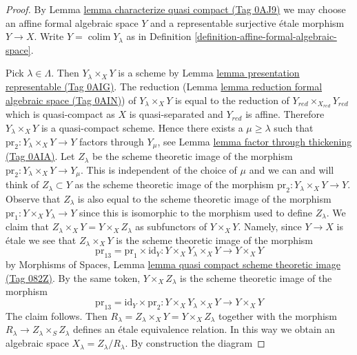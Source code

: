 \documentclass{amsart}
\theoremstyle{plain}
\theoremstyle{definition}
\theoremstyle{remark}
\numberwithin{equation}{subsection}
\def\colim{\mathop{\mathrm{colim}}\nolimits}
\begin{document}
\begin{proof}
By Lemma \href{https://stacks.math.columbia.edu/tag/0AJ9}{lemma characterize quasi compact (Tag 0AJ9)} we may choose an
affine formal algebraic space $Y$ and a representable surjective
\'etale morphism $Y \to X$. Write $Y = \colim Y_\lambda$ as in
Definition \ref{definition-affine-formal-algebraic-space}.

\medskip\noindent
Pick $\lambda \in \Lambda$. Then $Y_\lambda \times_X Y$ is a scheme by
Lemma \href{https://stacks.math.columbia.edu/tag/0AIG}{lemma presentation representable (Tag 0AIG)}. The reduction
(Lemma \href{https://stacks.math.columbia.edu/tag/0AIN}{lemma reduction formal algebraic space (Tag 0AIN)})
of $Y_\lambda \times_X Y$ is equal to the reduction of
$Y_{red} \times_{X_{red}} Y_{red}$ which is quasi-compact as $X$
is quasi-separated and $Y_{red}$ is affine.
Therefore $Y_\lambda \times_X Y$ is a quasi-compact scheme.
Hence there exists a $\mu \geq \lambda$ such that
$\text{pr}_2 : Y_\lambda \times_X Y \to Y$ factors
through $Y_\mu$, see Lemma \href{https://stacks.math.columbia.edu/tag/0AIA}{lemma factor through thickening (Tag 0AIA)}.
Let $Z_\lambda$ be the scheme theoretic image of the morphism
$\text{pr}_2 : Y_\lambda \times_X Y \to Y_\mu$.
This is independent of the choice of $\mu$ and we can and
will think of $Z_\lambda \subset Y$ as the scheme theoretic
image of the morphism $\text{pr}_2 : Y_\lambda \times_X Y \to Y$.
Observe that $Z_\lambda$ is also equal to the scheme theoretic image
of the morphism $\text{pr}_1 : Y \times_X Y_\lambda \to Y$ since
this is isomorphic to the morphism used to define $Z_\lambda$.
We claim that $Z_\lambda \times_X Y = Y \times_X Z_\lambda$ as subfunctors
of $Y \times_X Y$. Namely, since $Y \to X$ is \'etale we see that
$Z_\lambda \times_X Y$ is the scheme theoretic image of the morphism
$$
\text{pr}_{13} = \text{pr}_1 \times \text{id}_Y :
Y \times_X Y_\lambda \times_X Y \longrightarrow Y \times_X Y
$$
by Morphisms of Spaces, Lemma
\href{https://stacks.math.columbia.edu/tag/082Z}{lemma quasi compact scheme theoretic image (Tag 082Z)}.
By the same token, $Y \times_X Z_\lambda$ is the scheme theoretic image
of the morphism
$$
\text{pr}_{13} = \text{id}_Y \times \text{pr}_2 : 
Y \times_X Y_\lambda \times_X Y \longrightarrow Y \times_X Y
$$
The claim follows. Then
$R_\lambda = Z_\lambda \times_X Y = Y \times_X Z_\lambda$
together with the morphism $R_\lambda \to Z_\lambda \times_S Z_\lambda$
defines an \'etale equivalence relation. In this way we obtain an algebraic
space $X_\lambda = Z_\lambda/R_\lambda$. By construction the diagram

\end{proof}
\end{document}
